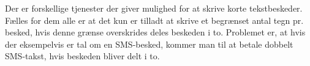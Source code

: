 Der er forskellige tjenester der giver mulighed for at skrive korte tekstbeskeder. Fælles for dem alle er at det kun er tilladt at skrive et begrænset antal tegn pr. besked, hvis denne grænse overskrides deles beskeden i to. Problemet er, at hvis der eksempelvis er tal om en SMS-besked, kommer man til at betale dobbelt SMS-takst, hvis beskeden bliver delt i to.